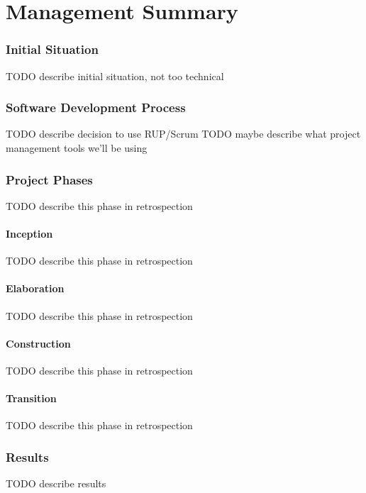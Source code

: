 \part*{Management Summary}\label{part:mgmtsummary}
\setcounter{secnumdepth}{0} %

\section*{Initial Situation}
TODO describe initial situation, not too technical

\section*{Software Development Process}
TODO describe decision to use RUP/Scrum
TODO maybe describe what project management tools we'll be using

\section*{Project Phases}
TODO describe this phase in retrospection

\subsection*{Inception}
TODO describe this phase in retrospection

\subsection*{Elaboration}
TODO describe this phase in retrospection

\subsection*{Construction}
TODO describe this phase in retrospection

\subsection*{Transition}
TODO describe this phase in retrospection

\section*{Results}
TODO describe results
